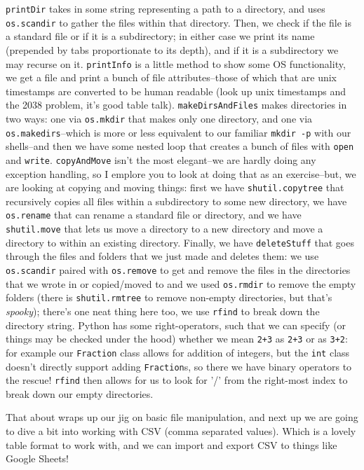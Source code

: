 \documentclass[11pt, twoside, reqno]{book}
\begin{document}
\texttt{printDir} takes in some string representing a path to a directory, and uses \texttt{os.scandir} to gather the files within that directory. Then, we check if the file is a standard file or if it is a subdirectory; in either case we print its name (prepended by tabs proportionate to its depth), and if it is a subdirectory we may recurse on it. \texttt{printInfo} is a little method to show some OS functionality, we get a file and print a bunch of file attributes--those of which that are unix timestamps are converted to be human readable (look up unix timestamps and the 2038 problem, it's good table talk). \texttt{makeDirsAndFiles} makes directories in two ways: one via \texttt{os.mkdir} that makes only one directory, and one via \texttt{os.makedirs}--which is more or less equivalent to our familiar \texttt{mkdir -p} with our shells--and then we have some nested loop that creates a bunch of files with \texttt{open} and \texttt{write}. \texttt{copyAndMove} isn't the most elegant--we are hardly doing any exception handling, so I emplore you to look at doing that as an exercise--but, we are looking at copying and moving things: first we have \texttt{shutil.copytree} that recursively copies all files within a subdirectory to some new directory, we have \texttt{os.rename} that can rename a standard file or directory, and we have \texttt{shutil.move} that lets us move a directory to a new directory and move a directory to within an existing directory. Finally, we have \texttt{deleteStuff} that goes through the files and folders that we just made and deletes them: we use \texttt{os.scandir} paired with \texttt{os.remove} to get and remove the files in the directories that we wrote in or copied/moved to and we used \texttt{os.rmdir} to remove the empty folders (there is \texttt{shutil.rmtree} to remove non-empty directories, but that's \textit{spooky}); there's one neat thing here too, we use \texttt{rfind} to break down the directory string. Python has some right-operators, such that we can specify (or things may be checked under the hood) whether we mean \texttt{2+3} as \texttt{2+3} or as \texttt{3+2}: for example our \texttt{Fraction} class allows for addition of integers, but the \texttt{int} class doesn't directly support adding \texttt{Fraction}s, so there we have binary operators to the rescue! \texttt{rfind} then allows for us to look for '/' from the right-most index to break down our empty directories.

That about wraps up our jig on basic file manipulation, and next up we are going to dive a bit into working with CSV (comma separated values). Which is a lovely table format to work with, and we can import and export CSV to things like Google Sheets!
\end{document}

